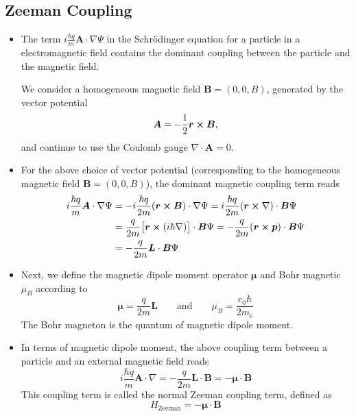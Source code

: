 \documentclass[11pt, a4paper]{article}
\renewcommand{\div}{\nabla \cdot}
\renewcommand{\grad}{\nabla}
\newcommand{\eqtext}[1]{\qquad \text{#1} \qquad}
\newcommand{\Schro}{Schr\"{o}dinger\xspace}
\renewcommand{\vec}[1]{\bm{#1}}  %
\renewcommand{\r}{\vec{r}}  %
\renewcommand{\L}{\vec{L}}  %
\newcommand{\A}{\vec{A}}  %
\newcommand{\B}{\vec{B}}  %
\newcommand{\m}{\vec{\mu}}  %
\renewcommand{\P}{\Psi}  %
\begin{document}
\subsection{Zeeman Coupling}
\begin{itemize}
	\item The term $ i \frac{\hbar q}{m}\A \cdot \grad \P $ in the \Schro equation for a particle in a electromagnetic field contains the dominant coupling between the particle and the magnetic field. 
	
	We consider a homogeneous magnetic field $ \vec{B} = (0, 0, B) $, generated by the vector potential
	\begin{equation*}
        \A = -\frac{1}{2}\r \cross \vec{B},
	\end{equation*}
	and continue to use the Coulomb gauge $ \div \A = 0 $. 
	
	\item For the above choice of vector potential (corresponding to the homogeneous magnetic field $ \vec{B} = (0, 0, B) $), the dominant magnetic coupling term reads
	\begin{align*}
		i \frac{\hbar q}{m}\A \cdot \grad \P &= - i\frac{\hbar q}{2m}(\r \cross \vec{B}) \cdot \grad \P = i\frac{\hbar q}{2m}(\r \cross \nabla) \cdot \vec{B} \P\\
		& = \frac{q}{2m}\big[\r \cross (i\hbar \nabla)\big] \cdot \vec{B} \P = - \frac{q}{2m}(\r \cross \vec{p}) \cdot \vec{B} \P \\
		& = - \frac{q}{2m}\vec{L} \cdot \B \P
	\end{align*}
	
	\item Next, we define the magnetic dipole moment operator $ \m $ and Bohr magnetic $ \mu_{B} $ according to
	\begin{equation*}
		\m = \frac{q}{2m}\L \eqtext{and} \mu_{B} = \frac{e_{0}\hbar}{2m_{\text{e}}}
	\end{equation*}
	The Bohr magneton is the quantum of magnetic dipole moment. 
	
	\item In terms of magnetic dipole moment, the above coupling term between a particle and an external magnetic field reads
	\begin{equation*}
		i \frac{\hbar q}{m}\A \cdot \grad = - \frac{q}{2m}\vec{L} \cdot \B = - \m \cdot \B
	\end{equation*}
	This coupling term is called the normal Zeeman coupling term, defined as
	\begin{equation*}
		H_{\text{Zeeman}} = - \m \cdot \B
	\end{equation*}
	

\end{itemize}
\end{document}
